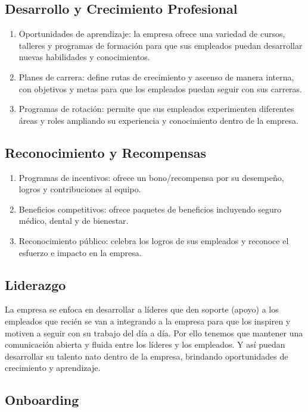 \documentclass{article}
\begin{document}
\subsection{Desarrollo y Crecimiento Profesional}

\begin{enumerate}
  \item Oportunidades de aprendizaje: la empresa ofrece una variedad de cursos, talleres y programas de formación para que sus empleados puedan desarrollar nuevas habilidades y conocimientos.
  \item Planes de carrera: define rutas de crecimiento y ascenso de manera interna, con objetivos y metas para que los empleados puedan seguir con sus carreras.
  \item Programas de rotación: permite que sus empleados experimenten diferentes áreas y roles ampliando su experiencia y conocimiento dentro de la empresa.
\end{enumerate}

\subsection{Reconocimiento y Recompensas}

\begin{enumerate}
  \item Programas de incentivos: ofrece un bono/recompensa por su desempeño, logros y contribuciones al equipo.
  \item Beneficios competitivos: ofrece paquetes de beneficios incluyendo seguro médico, dental y de bienestar.
  \item Reconocimiento público: celebra los logros de sus empleados y reconoce el esfuerzo e impacto en la empresa.
\end{enumerate}

\subsection{Liderazgo}

La empresa se enfoca en desarrollar a líderes que den soporte (apoyo) a los empleados que recién se van a integrando a la empresa para que los inspiren y motiven a seguir con su trabajo del día a día. Por ello tenemos que mantener una comunicación abierta y fluida entre los líderes y los empleados. Y así puedan desarrollar su talento nato dentro de la empresa, brindando oportunidades de crecimiento y aprendizaje.

\subsection{Onboarding}
\end{document}
